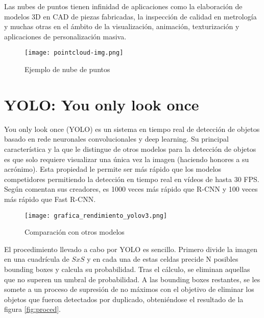 Las nubes de puntos tienen infinidad de aplicaciones como la elaboración de modelos 3D en CAD de piezas fabricadas, la inspección de calidad en metrología y muchas otras en el ámbito de la visualización, animación, texturización y aplicaciones de personalización masiva.\\

\begin{figure}[h]
	\begin{center} 
		\texttt{[image: pointcloud-img.png]}
	\end{center}
	\caption{Ejemplo de nube de puntos}
	\label{fig:pc}
\end{figure}

\section{YOLO: You only look once}

You only look once (YOLO) es un sistema en tiempo real de detección de objetos basado en rede neuronales convolucionales y deep learning. Su principal característica y la que le distingue de otros modelos para la detección de objetos es que solo requiere visualizar una única vez la imagen (haciendo honores a su acrónimo). Esta propiedad le permite ser más rápido que los modelos competidores permitiendo la detección en tiempo real en vídeos de hasta 30 FPS. Según comentan sus creadores, es 1000 veces más rápido que R-CNN y 100 veces más rápido que Fast R-CNN. \\

\begin{figure}[h]
	\begin{center} 
		\texttt{[image: grafica\_rendimiento\_yolov3.png]}
	\end{center}
	\caption{Comparación con otros modelos}
	\label{fig:rend}
\end{figure}


El procedimiento llevado a cabo por YOLO es sencillo. Primero divide la imagen en una cuadrícula de $SxS$ y en cada una de estas celdas precide N posibles bounding boxes y calcula su probabilidad. Tras el cálculo, se eliminan aquellas que no superen un umbral de probabilidad. A las bounding boxes restantes, se les somete a un proceso de supresión de no máximos con el objetivo de eliminar los objetos que fueron detectados por duplicado, obteniéndose el resultado de la figura \ref{fig:proced}.\\

